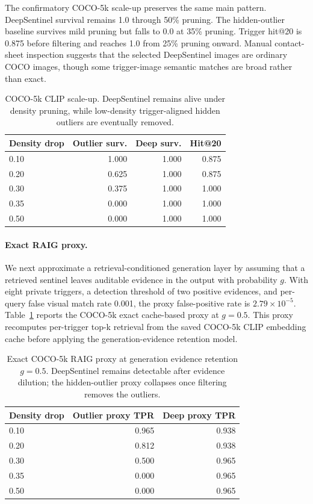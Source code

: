 \documentclass[letterpaper]{article}
\begin{document}
The confirmatory COCO-5k scale-up preserves the same main pattern. DeepSentinel
survival remains 1.0 through 50\% pruning. The hidden-outlier baseline survives
mild pruning but falls to 0.0 at 35\% pruning. Trigger hit@20 is 0.875 before
filtering and reaches 1.0 from 25\% pruning onward. Manual contact-sheet
inspection suggests that the selected DeepSentinel images are ordinary COCO
images, though some trigger-image semantic matches are broad rather than exact.

\begin{table}[t]
\centering
\small
\begin{tabular}{lrrr}
\toprule
Density drop & Outlier surv. & Deep surv. & Hit@20 \\
\midrule
0.10 & 1.000 & 1.000 & 0.875 \\
0.20 & 0.625 & 1.000 & 0.875 \\
0.30 & 0.375 & 1.000 & 1.000 \\
0.35 & 0.000 & 1.000 & 1.000 \\
0.50 & 0.000 & 1.000 & 1.000 \\
\bottomrule
\end{tabular}
\caption{COCO-5k CLIP scale-up. DeepSentinel remains alive under density
pruning, while low-density trigger-aligned hidden outliers are eventually
removed.}
\end{table}

\paragraph{Exact RAIG proxy.}
We next approximate a retrieval-conditioned generation layer by assuming that a
retrieved sentinel leaves auditable evidence in the output with probability
$g$. With eight private triggers, a detection threshold of two positive
evidences, and per-query false visual match rate 0.001, the proxy false-positive
rate is $2.79\times 10^{-5}$. Table~\ref{tab:raig-proxy} reports the
COCO-5k exact cache-based proxy at $g=0.5$. This proxy recomputes per-trigger
top-k retrieval from the saved COCO-5k CLIP embedding cache before applying the
generation-evidence retention model.

\begin{table}[t]
\centering
\small
\begin{tabular}{lrr}
\toprule
Density drop & Outlier proxy TPR & Deep proxy TPR \\
\midrule
0.10 & 0.965 & 0.938 \\
0.20 & 0.812 & 0.938 \\
0.30 & 0.500 & 0.965 \\
0.35 & 0.000 & 0.965 \\
0.50 & 0.000 & 0.965 \\
\bottomrule
\end{tabular}
\caption{Exact COCO-5k RAIG proxy at generation evidence retention $g=0.5$.
DeepSentinel remains detectable after evidence dilution; the hidden-outlier
proxy collapses once filtering removes the outliers.}
\label{tab:raig-proxy}
\end{table}
\end{document}
